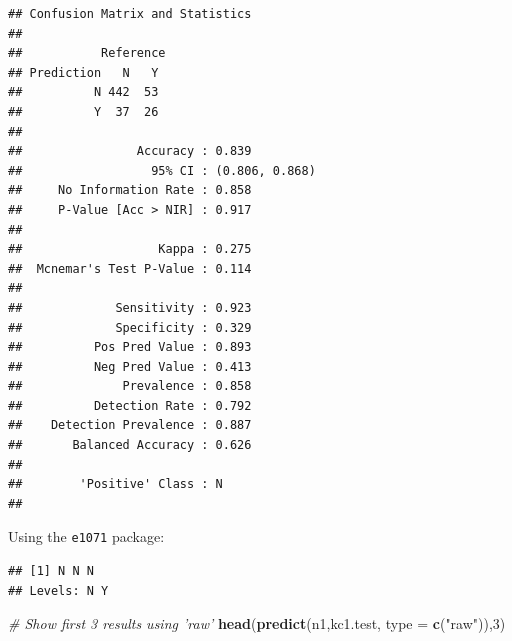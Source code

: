 \documentclass[]{book}
\newenvironment{Shaded}{\begin{snugshade}}{\end{snugshade}}
\newcommand{\KeywordTok}[1]{\textcolor[rgb]{0.13,0.29,0.53}{\textbf{{#1}}}}
\newcommand{\DataTypeTok}[1]{\textcolor[rgb]{0.13,0.29,0.53}{{#1}}}
\newcommand{\DecValTok}[1]{\textcolor[rgb]{0.00,0.00,0.81}{{#1}}}
\newcommand{\StringTok}[1]{\textcolor[rgb]{0.31,0.60,0.02}{{#1}}}
\newcommand{\CommentTok}[1]{\textcolor[rgb]{0.56,0.35,0.01}{\textit{{#1}}}}
\newcommand{\NormalTok}[1]{{#1}}
\begin{document}
\begin{verbatim}
## Confusion Matrix and Statistics
## 
##           Reference
## Prediction   N   Y
##          N 442  53
##          Y  37  26
##                                         
##                Accuracy : 0.839         
##                  95% CI : (0.806, 0.868)
##     No Information Rate : 0.858         
##     P-Value [Acc > NIR] : 0.917         
##                                         
##                   Kappa : 0.275         
##  Mcnemar's Test P-Value : 0.114         
##                                         
##             Sensitivity : 0.923         
##             Specificity : 0.329         
##          Pos Pred Value : 0.893         
##          Neg Pred Value : 0.413         
##              Prevalence : 0.858         
##          Detection Rate : 0.792         
##    Detection Prevalence : 0.887         
##       Balanced Accuracy : 0.626         
##                                         
##        'Positive' Class : N             
## 
\end{verbatim}

Using the \texttt{e1071} package:

\begin{Shaded}
\end{Shaded}

\begin{verbatim}
## [1] N N N
## Levels: N Y
\end{verbatim}

\begin{Shaded}
\begin{Highlighting}[]
\CommentTok{# Show first 3 results using 'raw'}
\KeywordTok{head}\NormalTok{(}\KeywordTok{predict}\NormalTok{(n1,kc1.test, }\DataTypeTok{type =} \KeywordTok{c}\NormalTok{(}\StringTok{"raw"}\NormalTok{)),}\DecValTok{3}\NormalTok{)}
\end{Highlighting}
\end{Shaded}
\end{document}
